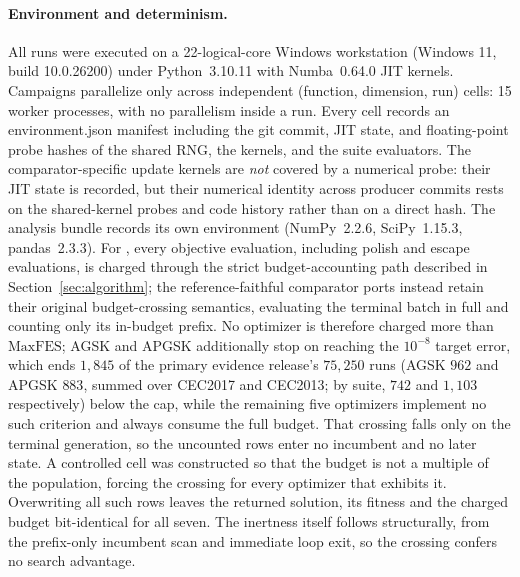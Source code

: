 \paragraph{Environment and determinism.}
All runs were executed on a 22-logical-core Windows workstation
(Windows 11, build 10.0.26200) under Python~3.10.11 with Numba~0.64.0
JIT kernels. Campaigns parallelize only across independent
(function, dimension, run) cells: 15 worker processes, with no parallelism
inside a run. Every cell records an environment.json
manifest including the git commit, JIT state, and floating-point
probe hashes of the shared RNG, the \dtgsk{} kernels, and the suite
evaluators. The comparator-specific update kernels are \emph{not} covered
by a numerical probe: their JIT state is recorded, but their numerical
identity across producer commits rests on the shared-kernel probes and code
history rather than on a direct hash.
The analysis bundle records its own environment (NumPy~2.2.6,
SciPy~1.15.3, pandas~2.3.3).
For \dtgsk{}, every objective evaluation, including polish and escape
evaluations, is charged through the strict budget-accounting path
described in Section~\ref{sec:algorithm}; the reference-faithful
comparator ports instead retain their original budget-crossing
semantics, evaluating the terminal batch in full and counting only its
in-budget prefix. No optimizer is therefore charged more than
$\mathrm{MaxFES}$; AGSK and APGSK additionally stop on reaching the
$10^{-8}$ target error, which ends $1{,}845$ of the primary evidence
release's $75{,}250$ runs
(AGSK $962$ and APGSK $883$, summed over CEC2017 and CEC2013; by suite,
$742$ and $1{,}103$ respectively) below the cap, while
the remaining five optimizers implement no such criterion and always consume
the full budget. That crossing falls only on the terminal
generation, so the uncounted rows enter no incumbent and no later state.
A controlled cell was constructed so that the budget is not a multiple of the
population, forcing the crossing for every optimizer that exhibits it.
Overwriting all such rows leaves the returned solution, its fitness and the
charged budget bit-identical for all seven. The inertness itself follows
structurally, from the prefix-only incumbent scan and immediate loop exit, so
the crossing confers no search advantage.
